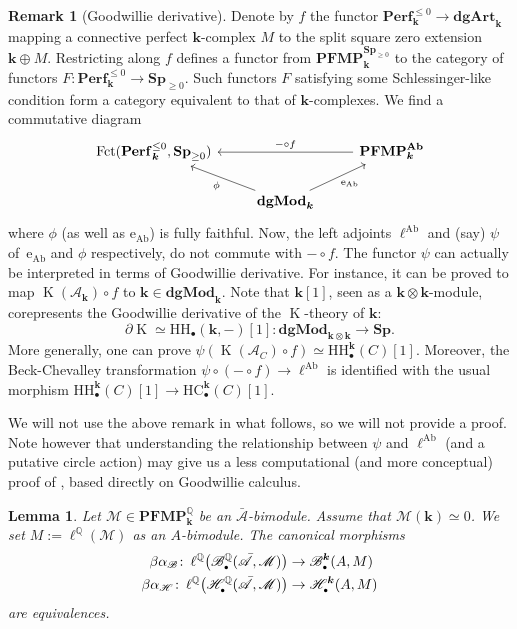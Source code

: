 \documentclass[JEP,XML,SOM,Unicode,NoEqCountersInSection]{cedram}
\let\mathcal\mathscr
\let\autoref\Cref
\let\widebar\bar
\newcounter{condition}
\newcommand{\sbullet}{{\scriptscriptstyle\bullet}}
\newtheorem{lem}[thm]{Lemma}
\theoremstyle{definition}
\newtheorem{rmq}[thm]{Remark}
\newcommand{\Q}{\mathbb{Q}}
\renewcommand{\Mc}{\mathcal{M}}
\newcommand{\Bc}{\mathcal{B}}
\newcommand{\Hc}{\mathcal{H}}
\newcommand{\Sp}{\mathbf{Sp}}
\newcommand{\dgArt}{\mathbf{dgArt}}
\newcommand{\dgMod}{\mathbf{dgMod}}
\newcommand{\Perf}{\mathbf{Perf}}
\DeclareMathOperator{\Fct}{Fct}
\DeclareMathOperator{\K}{K}
\let\originalleft\left
\let\originalright\right
\renewcommand{\left}{\mathopen{}\mathclose\bgroup\originalleft}
\renewcommand{\right}{\aftergroup\egroup\originalright}
\newcommand{\HC}{\mathrm{HC}}
\newcommand{\HH}{\mathrm{HH}}
\newcommand{\Ab}{\mathbf{Ab}}
\renewcommand{\k}{{\boldsymbol{k}}}
\newcommand{\eAb}{\operatorname{e_{Ab}}}
\newcommand{\ellAb}{\operatorname{\ell^{Ab}}}
\newcommand{\ellQ}{\operatorname{\ell^\Q}}
\newcommand{\Ac}{\mathcal{A}}
\newcommand{\bAc}{\widebar{\mathcal{A}}}
\newcommand{\PFMP}{\mathbf{PFMP}}
\begin{document}
\begin{rmq}[Goodwillie derivative]\label{rmk:goodwilliederivative}
Denote by $f$ the functor $\Perf_\k^{\leq 0} \to \dgArt_\k$ mapping a connective perfect $\k$-complex $M$ to the split square zero extension $\k \oplus M$. Restricting along $f$ defines a functor from $\PFMP_\k^{\Sp_{\geq 0}}$ to the category of functors $F \colon \Perf_\k^{\leq 0} \to \Sp_{\geq 0}$. Such functors $F$ satisfying some Schlessinger-like condition form a category equivalent to that of $\k$-complexes. We find a commutative diagram
\[
\begin{tikzcd}
\Fct(\Perf_\k^{\leq 0}, \Sp_{\geq 0}) && \ar{ll}[swap]{- \circ f} \PFMP_\k^{\Ab} \\
& \dgMod_\k \ar{ur}[swap]{\eAb} \ar{ul}{\phi}
\end{tikzcd}
\]
where $\phi$ (as well as $\eAb$) is fully faithful. Now, the left adjoints $\ellAb$ and (say) $\psi$ of~$\eAb$ and $\phi$ respectively, do not commute with $- \circ f$.
The functor $\psi$ can actually be interpreted in terms of Goodwillie derivative. For instance, it can be proved to map $\K(\Ac_\k) \circ f$ to $\k \in \dgMod_\k$. Note that $\k[1]$, seen as a $\k \otimes \k$-module, corepresents the Goodwillie derivative of the $\K$-theory of $\k$:
\[
\partial \K \simeq \HH_\sbullet(\k, -)[1] \colon \dgMod_{\k \otimes \k} \to \Sp.
\]
More generally, one can prove $\psi(\K(\Ac_C) \circ f) \simeq \HH_\sbullet^\k(C)[1]$. Moreover, the Beck-Chevalley transformation $\psi \circ (- \circ f) \to \ellAb$ is identified with the usual morphism $\HH_\sbullet^\k(C)[1] \to \HC_\sbullet^\k(C)[1]$.

We will not use the above remark in what follows, so we will not provide a proof.
Note however that understanding the relationship between $\psi$ and $\ellAb$ (and a putative circle action) may give us a less computational (and more conceptual) proof of \autoref{cor:tgtK}, based directly on Goodwillie calculus.
\end{rmq}

\begin{lem}\label{lem:ellBH}
Let $\Mc \in \PFMP_\k^\Q$ be an $\bAc$-bimodule. Assume that $\Mc(\k) \simeq 0$. We set $M := \ellQ(\Mc)$ as an $A$-bimodule.
The canonical morphisms
\begin{align*}
\beta\alpha_\Bc \colon \ellQ\left(\Bc_\sbullet^\Q(\bAc, \Mc) \right) &\to \Bc_\sbullet^\k(A,M)\\
\beta\alpha_\Hc \colon \ellQ\left(\Hc_\sbullet^\Q(\bAc, \Mc) \right) &\to \Hc_\sbullet^\k(A,M)
\end{align*}
are equivalences.
\end{lem}
\end{document}
